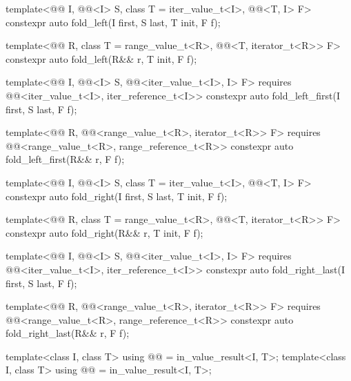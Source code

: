 \begin{codeblock}
{{    template<@@ I, @@<I> S, class T = iter_value_t<I>,
             @@<T, I> F>
      constexpr auto fold_left(I first, S last, T init, F f);

    template<@@ R, class T = range_value_t<R>,
             @@<T, iterator_t<R>> F>
      constexpr auto fold_left(R&& r, T init, F f);

    template<@@ I, @@<I> S,
             @@<iter_value_t<I>, I> F>
      requires @@<iter_value_t<I>, iter_reference_t<I>>
      constexpr auto fold_left_first(I first, S last, F f);

    template<@@ R, @@<range_value_t<R>, iterator_t<R>> F>
      requires @@<range_value_t<R>, range_reference_t<R>>
      constexpr auto fold_left_first(R&& r, F f);

    template<@@ I, @@<I> S, class T = iter_value_t<I>,
             @@<T, I> F>
      constexpr auto fold_right(I first, S last, T init, F f);

    template<@@ R, class T = range_value_t<R>,
             @@<T, iterator_t<R>> F>
      constexpr auto fold_right(R&& r, T init, F f);

    template<@@ I, @@<I> S,
             @@<iter_value_t<I>, I> F>
      requires @@<iter_value_t<I>, iter_reference_t<I>>
      constexpr auto fold_right_last(I first, S last, F f);

    template<@@ R,
             @@<range_value_t<R>, iterator_t<R>> F>
      requires @@<range_value_t<R>, range_reference_t<R>>
      constexpr auto fold_right_last(R&& r, F f);

    template<class I, class T>
      using @@ = in_value_result<I, T>;
    template<class I, class T>
      using @@ = in_value_result<I, T>;

}}
\end{codeblock}

